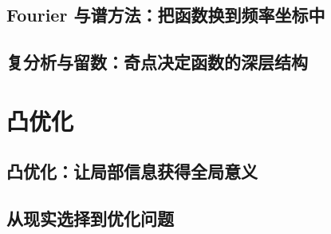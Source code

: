 \documentclass[UTF8,openany]{ctexbook}
\theoremstyle{definition}
\theoremstyle{plain}
\begin{document}
\chapter*{Fourier 与谱方法：把函数换到频率坐标中}
\label{ch:068}







\clearpage
\chapter*{复分析与留数：奇点决定函数的深层结构}
\label{ch:069}




\clearpage
\part{凸优化}
\chapter*{凸优化：让局部信息获得全局意义}
\label{ch:070}

\clearpage
\chapter*{从现实选择到优化问题}
\label{ch:071}



\clearpage
\end{document}
